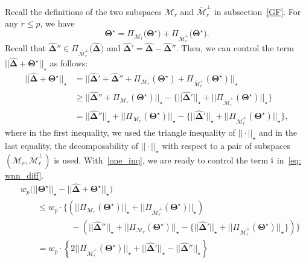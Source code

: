 \documentclass[alpha-refs]{wiley-article}
\newcommand{\RN}[1]{ \textup{\uppercase\expandafter{\romannumeral#1}} }
\begin{document}
\noindent
Recall the definitions of the two subspaces $\mathcal{M}_{r}$ and $\overline{\mathcal{M}}_{r}^{\perp}$ in subsection~\ref{GF}.
For any $r\leq p$, we have
\begin{equation} \label{star}
    \boldsymbol{\Theta^{\star}} = \Pi_{\mathcal{M}_{r}}\big(\boldsymbol{\Theta^{\star}}\big) +  \Pi_{\overline{\mathcal{M}}_{r}^{\perp}}\big(\boldsymbol{\Theta^{\star}}\big).
\end{equation}
Recall that $\boldsymbol{\widehat{\Delta}}'' \in \Pi_{\overline{\mathcal{M}}_{r}^{\perp}}\big(\boldsymbol{\widehat{\Delta}}\big)$ and 
$\boldsymbol{\widehat{\Delta}}'=\boldsymbol{\widehat{\Delta}}-\boldsymbol{\widehat{\Delta}}''$.
Then, we can control the term $||\boldsymbol{\widehat{\Delta}} + \boldsymbol{\Theta^{\star}}||_{\star}$ as follows: 
\begin{align}
    ||\boldsymbol{\widehat{\Delta}} + \boldsymbol{\Theta^{\star}}||_{\star} & =  ||\boldsymbol{\widehat{\Delta}}' + \boldsymbol{\widehat{\Delta}}'' + \Pi_{\mathcal{M}_{r}}(\boldsymbol{\Theta^{\star}}) + \Pi_{\overline{\mathcal{M}}_{r}^{\perp}}(\boldsymbol{\Theta^{\star}})||_{\star}\nonumber \\
    & \geq  ||\boldsymbol{\widehat{\Delta}}'' + \Pi_{\mathcal{M}_{r}}(\boldsymbol{\Theta^{\star}})||_{\star} - \{||\boldsymbol{\widehat{\Delta}}'||_{\star} + ||\Pi_{\overline{\mathcal{M}}_{r}^{\perp}}(\boldsymbol{\Theta^{\star}})||_{\star}\} \nonumber\\
    & =  ||\boldsymbol{\widehat{\Delta}}''||_{\star} + ||\Pi_{\mathcal{M}_{r}}(\boldsymbol{\Theta^{\star}})||_{\star} - \{||\boldsymbol{\widehat{\Delta}}'||_{\star} + ||\Pi_{\overline{\mathcal{M}}_{r}^{\perp}}(\boldsymbol{\Theta^{\star}})||_{\star}\} \label{one_inq},
\end{align}
where in the first inequality, we used the triangle inequality of $||\cdot||_{\star}$ and in the last equality, the decomposability of $||\cdot||_{\star}$ with respect to a pair of subspaces $(\mathcal{M}_{r},\overline{\mathcal{M}}_{r}^{\perp})$ is used.
With~\eqref{one_inq}, we are ready to control the term $\RN{1}$ in~\eqref{eq: wnn_diff}.
\begin{align}
    & w_{p}\Bigg( ||\boldsymbol{\Theta^{\star}}||_{\star} - ||\boldsymbol{\widehat{\Delta}} + \boldsymbol{\Theta^{\star}}||_{\star} \Bigg) 
    \nonumber \\
    & \qquad \leq  w_{p} \cdot \Bigg\{ \left( ||\Pi_{\mathcal{M}_{r}}(\boldsymbol{\Theta^{\star}})||_{\star} + ||\Pi_{\overline{\mathcal{M}}_{r}^{\perp}}(\boldsymbol{\Theta^{\star}})||_{\star} \right) \nonumber \\ 
    & \qquad \qquad \qquad - \left(||\boldsymbol{\widehat{\Delta}}''||_{\star} + ||\Pi_{\mathcal{M}_{r}}(\boldsymbol{\Theta^{\star}})||_{\star} - \{||\boldsymbol{\widehat{\Delta}}'||_{\star} + ||\Pi_{\overline{\mathcal{M}}_{r}^{\perp}}(\boldsymbol{\Theta^{\star}})||_{\star}\} \right) \Bigg\} \nonumber \\
    & \qquad =  w_{p} \cdot \left\lbrace 2||\Pi_{\overline{\mathcal{M}}_{r}^{\perp}}(\boldsymbol{\Theta^{\star}})||_{\star} + ||\boldsymbol{\widehat{\Delta}}'||_{\star} - ||\boldsymbol{\widehat{\Delta}}''||_{\star} \right\rbrace \label{eq: wnn_diff_1}
\end{align}
\end{document}
